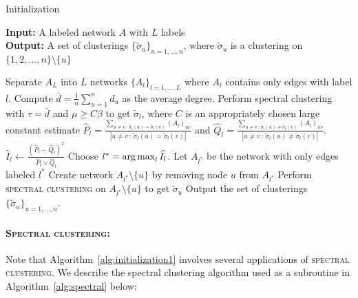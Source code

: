\documentclass{article}
\begin{document}
\begin{algorithm}[h!]
\caption{Initialization}
\label{alg:initialization1}
\textbf{Input:} A labeled network $A$ with $L$ labels \\
\textbf{Output:} A set of clusterings $\{ \tilde{\sigma}_u \}_{u=1, \dots, n}$, where $\tilde \sigma_u$ is a clustering on $\{1, 2, \dots, n\} \setminus \{u\}$\\

\begin{algorithmic}[1]
\State Separate $A_L$ into $L$ networks $\{ A_l \}_{l=1, \dots, L}$ where $A_l$ contains only edges with label $l$.  
   \State Compute $\bar{d} = \frac{1}{n} \sum_{u=1}^n d_u$ as the average degree.
   \State Perform spectral clustering with $\tau = \bar{d}$ and $\mu \geq C\beta$ to get $\tilde{\sigma}_l$, where $C$ is an appropriately chosen large constant
   \State estimate $\hat{P}_l = 
             \frac{ \sum_{u \neq v \,:\, \tilde{\sigma}_l(u) = \tilde{\sigma}_l(v) } (A_l)_{uv} }
                  { |{u \neq v \,:\, \tilde{\sigma}_l(u) = \tilde{\sigma}_l(v) }| }$ and 
               $\hat{Q}_l = 
            \frac{ \sum_{u \neq v \,:\, \tilde{\sigma}_l(u) \neq \tilde{\sigma}_l(v) } (A_l)_{uv} }
              { |{u \neq v \,:\, \tilde{\sigma}_l(u) \neq \tilde{\sigma}_l(v) }| }$. 
   \State $\hat{I}_l \leftarrow 
               \frac{ (\hat{P}_l - \hat{Q}_l)^2}{\hat{P}_l \vee \hat{Q}_l}$
\EndFor
\State Choose $l^* = \mathop{\text{\rm arg\,max}}_l \widehat{I}_l$. Let $A_{l^*}$ be the network with only edges labeled $l^*$
  
   \State Create network $A_{l^*} \setminus \{u\}$ by removing node $u$ from $A_{l^*}$
   \State Perform \textsc{spectral clustering} on $A_{l^*} \setminus \{ u \}$ to get $\tilde{\sigma}_u$
\EndFor 
\State Output the set of clusterings $\{ \tilde{\sigma}_u \}_{u=1, \dots, n}$.
\end{algorithmic}
\end{algorithm}

\paragraph{\textbf{\textsc{Spectral clustering}:}} Note that Algorithm~\ref{alg:initialization1} involves several applications of \textsc{spectral clustering}. We describe the spectral clustering algorithm used as a subroutine in Algorithm~\ref{alg:spectral} below:
\end{document}
